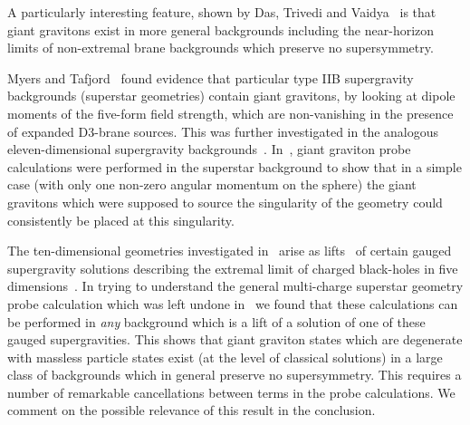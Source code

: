 \documentclass[a4paper,12pt]{article}
\begin{document}
A particularly interesting feature, shown by
Das, Trivedi and Vaidya~\cite{Das:2000ab} is that giant gravitons exist in
more general backgrounds including the near-horizon limits of non-extremal brane backgrounds which
preserve no supersymmetry.

Myers and Tafjord~\cite{Myers:2001aq} found evidence that particular type IIB
supergravity backgrounds (superstar geometries) contain giant gravitons, by
looking at dipole moments
of the five-form field strength, which are non-vanishing in the presence of expanded D3-brane sources. This was further investigated in the
analogous eleven-dimensional supergravity backgrounds~\cite{Balasubramanian:2001dx, Leblond:2001gn}. In~\cite{Leblond:2001gn}, giant graviton probe calculations were performed in the superstar background to show that in a simple case (with only one non-zero angular momentum on the sphere) the giant gravitons which were supposed to source the singularity of the geometry could consistently be placed at this singularity.

The ten-dimensional geometries investigated in~\cite{Myers:2001aq} arise as
lifts~\cite{Cvetic:1999xp} of certain gauged supergravity solutions describing
the extremal limit of charged black-holes in five
dimensions~\cite{Behrndt:1998ns, Behrndt:1998jd}. In trying to understand the
general multi-charge superstar geometry probe calculation which was left undone
in~\cite{Leblond:2001gn} we found that these calculations can be performed in
{\it any} background which is a lift of a solution of one of these gauged
supergravities. This shows that giant graviton states which are degenerate with massless particle states exist (at the level of classical solutions) in a large class of backgrounds which in general preserve no supersymmetry. This requires a number of remarkable cancellations between terms in the probe calculations. We comment on the possible relevance of this result in the conclusion.
\end{document}
